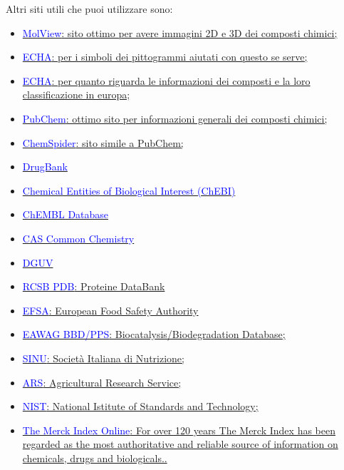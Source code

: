 Altri siti utili che puoi utilizzare sono:
\begingroup
\begin{multicols}{2}
\begin{itemize}
    \item \href{https://molview.org/}{\textcolor{blue}{MolView}: sito ottimo per avere immagini 2D e 3D dei composti chimici;}
    \item \href{https://echa.europa.eu/it/regulations/clp/clp-pictograms}{\textcolor{blue}{ECHA}: per i simboli dei pittogrammi aiutati con questo se serve;}
    \item \href{https://echa.europa.eu/it/information-on-chemicals/cl-inventory-database}{\textcolor{blue}{ECHA}: per quanto riguarda le informazioni dei composti e la loro classificazione in europa;}
    \item \href{https://pubchem.ncbi.nlm.nih.gov/}{\textcolor{blue}{PubChem}: ottimo sito per informazioni generali dei composti chimici;}
    \item \href{http://www.chemspider.com/}{\textcolor{blue}{ChemSpider}: sito simile a PubChem;}
    \item \href{https://go.drugbank.com/}{\textcolor{blue}{DrugBank}}
    \item \href{https://www.ebi.ac.uk/chebi/init.do}{\textcolor{blue}{Chemical Entities of Biological Interest (ChEBI)}}
    \item \href{https://www.ebi.ac.uk/chembl/}{\textcolor{blue}{ChEMBL Database}}
    \item \href{https://commonchemistry.cas.org/}{\textcolor{blue}{CAS Common Chemistry}}
    \item \href{https://dguv.de/corona/index.jsp}{\textcolor{blue}{DGUV}}
    \item \href{https://www.rcsb.org/}{\textcolor{blue}{RCSB PDB}: Proteine DataBank}
    \item \href{https://www.efsa.europa.eu/it}{\textcolor{blue}{EFSA}: European Food Safety Authority}
    \item \href{http://eawag-bbd.ethz.ch/}{\textcolor{blue}{EAWAG BBD/PPS}: Biocatalysis/Biodegradation Database;}
    \item \href{https://sinu.it/}{\textcolor{blue}{SINU}: Società Italiana di Nutrizione;}
    \item \href{https://www.ars.usda.gov/}{\textcolor{blue}{ARS}: Agricultural Research Service;}
    \item \href{https://www.nist.gov/}{\textcolor{blue}{NIST}: National Istitute of Standards and Technology;}
    \item \href{https://www.rsc.org/merck-index}{\textcolor{blue}{The Merck Index Online}: For over 120 years The Merck Index has been regarded as the most authoritative and reliable source of information on chemicals, drugs and biologicals..}
\end{itemize}
\end{multicols}
\endgroup